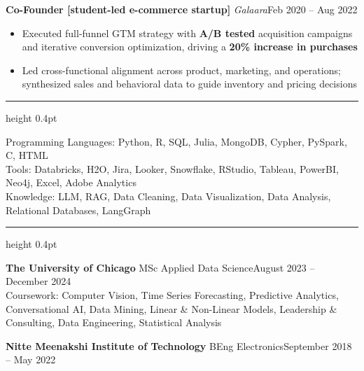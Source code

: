 \documentclass[10pt, letterpaper]{article}
\newcommand{\ressection}[1]{%
  \noindent{\large\bfseries\scshape #1}\par%
  \vspace{1pt}%
  \hrule height 0.4pt%
  \vspace{3pt}%
}
\newcommand{\jobentry}[3]{%
  \noindent\textbf{#1} \textbar{} \textit{#2}\hfill #3\par\vspace{-2pt}%
}
\newcommand{\eduentry}[3]{%
  \noindent
  \textbf{#1} \textperiodcentered{} #2\hfill #3\\
}
\newenvironment{bullets}{%
  \begin{itemize}[
    leftmargin=0.125in,
    itemsep=0pt,
    parsep=0pt,
    topsep=0pt,
    partopsep=0pt,
    label=\textbullet
  ]
}{%
  \end{itemize}
}
\begin{document}
\vspace{3pt}
\jobentry{Co-Founder {[}student-led e-commerce startup{]}}{\fontfamily{ptm}\selectfont Galaara}{Feb 2020 -- Aug 2022}
\begin{bullets}
  \item Executed full-funnel GTM strategy with \textbf{A/B tested} acquisition campaigns and iterative conversion optimization, driving a \textbf{20\% increase in purchases}
  \item Led cross-functional alignment across product, marketing, and operations; synthesized sales and behavioral data to guide inventory and pricing decisions
\end{bullets}

\vspace{4pt}
\ressection{Skills}

\noindent Programming Languages: Python, R, SQL, Julia, MongoDB, Cypher, PySpark, C, HTML\\
\noindent Tools: Databricks, H2O, Jira, Looker, Snowflake, RStudio, Tableau, PowerBI, Neo4j, Excel, Adobe Analytics\\
\noindent Knowledge: LLM, RAG, Data Cleaning, Data Visualization, Data Analysis, Relational Databases, LangGraph

\vspace{4pt}
\ressection{Education}

\eduentry{The University of Chicago}{MSc Applied Data Science}{August 2023 -- December 2024}
\noindent Coursework: Computer Vision, Time Series Forecasting, Predictive Analytics, Conversational AI, Data Mining, Linear \& Non-Linear Models, Leadership \& Consulting, Data Engineering, Statistical Analysis

\eduentry{Nitte Meenakshi Institute of Technology}{BEng Electronics}{September 2018 -- May 2022}
\end{document}
